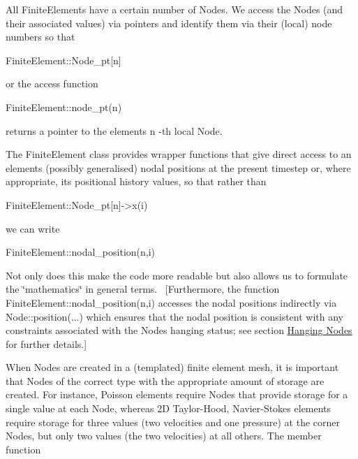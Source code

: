 \begin{DoxyItemize}
\item All {\ttfamily Finite\+Elements} have a certain number of {\ttfamily Nodes}. We access the {\ttfamily Nodes} (and their associated values) via pointers and identify them via their (local) node numbers so that 
\begin{DoxyCode}
FiniteElement::Node\_pt[n] 
\end{DoxyCode}
 or the access function 
\begin{DoxyCode}
FiniteElement::node\_pt(n) 
\end{DoxyCode}
 returns a pointer to the element\textquotesingle{}s {\ttfamily n} -\/th local {\ttfamily Node}.
\begin{DoxyItemize}
\item The {\ttfamily Finite\+Element} class provides wrapper functions that give direct access to an element\textquotesingle{}s (possibly generalised) nodal positions at the present timestep or, where appropriate, its positional history values, so that rather than 
\begin{DoxyCode}
FiniteElement::Node\_pt[n]->x(i) 
\end{DoxyCode}
 we can write 
\begin{DoxyCode}
FiniteElement::nodal\_position(n,i) 
\end{DoxyCode}
 Not only does this make the code more readable but also allows us to formulate the \char`\"{}mathematics\char`\"{} in general terms.~\newline
 \mbox{[}Furthermore, the function {\ttfamily Finite\+Element\+::nodal\+\_\+position(n,i)} accesses the nodal positions indirectly via {\ttfamily Node\+::position}(...) which ensures that the nodal position is consistent with any constraints associated with the {\ttfamily Node\textquotesingle{}s} hanging status; see section \hyperlink{index_Hanging_Nodes}{Hanging Nodes} for further details.\mbox{]}
\item When {\ttfamily Nodes} are created in a (templated) finite element mesh, it is important that {\ttfamily Nodes} of the correct type with the appropriate amount of storage are created. For instance, Poisson elements require {\ttfamily Nodes} that provide storage for a single value at each {\ttfamily Node}, whereas 2D Taylor-\/\+Hood, Navier-\/\+Stokes elements require storage for three values (two velocities and one pressure) at the corner {\ttfamily Nodes}, but only two values (the two velocities) at all others. The member function 
\begin{DoxyCode}

\end{DoxyCode}
\end{DoxyItemize}
\end{DoxyItemize}
